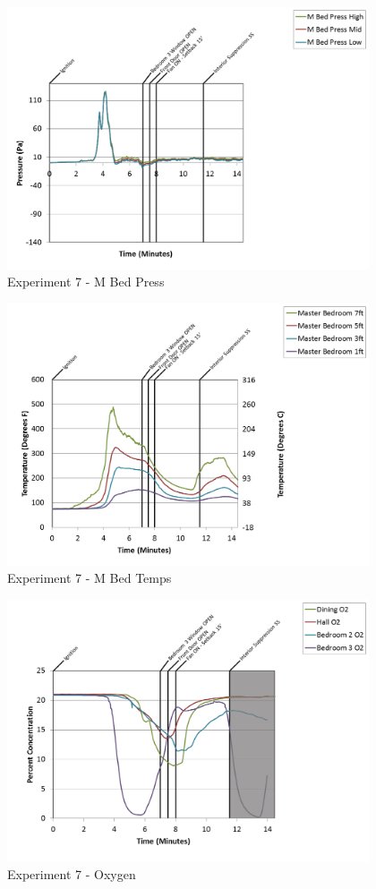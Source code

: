 \documentclass{article}
\begin{document}
\begin{appendices}
\begin{figure}[h!]
	\centering
	\includegraphics[height=3.05in]{0_Images/Results_Charts/Exp_7_Charts/MBedPress.png}
	\caption{Experiment 7 - M Bed Press}
\end{figure}

\clearpage

\begin{figure}[h!]
	\centering
	\includegraphics[height=3.05in]{0_Images/Results_Charts/Exp_7_Charts/MBedTemps.png}
	\caption{Experiment 7 - M Bed Temps}
\end{figure}


\begin{figure}[h!]
	\centering
	\includegraphics[height=3.05in]{0_Images/Results_Charts/Exp_7_Charts/Oxygen.png}
	\caption{Experiment 7 - Oxygen}
\end{figure}


\end{appendices}
\end{document}
